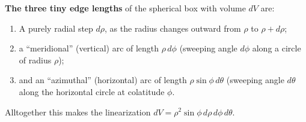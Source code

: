 \documentclass{ximera}
\begin{document}






\textbf{The three tiny edge lengths} of the spherical box with volume $dV$ are: 

\begin{enumerate}

\item A purely radial step $d\rho$, as the radius changes outward from $\rho$ to $\rho + d\rho$;
\item a ``meridional'' (vertical) arc of length $\rho\,d\phi$ (sweeping angle $d\phi$ along a circle of radius $\rho$); 
\item and an ``azimuthal'' (horizontal) arc of length $\rho\sin\phi\,d\theta$ (sweeping angle $d\theta$ along the horizontal circle at colatitude $\phi$.

\end{enumerate}

Alltogether this makes the linearization $dV = \rho^2\sin\phi\,d\rho\,d\phi\,d\theta$.
\end{document}
